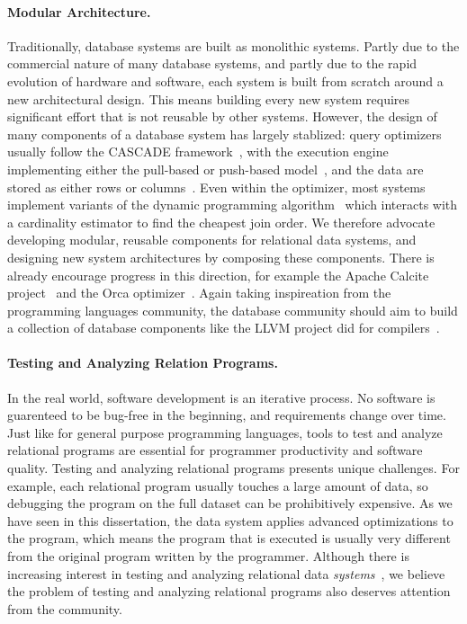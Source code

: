 \paragraph*{Modular Architecture.}
Traditionally, database systems are built as monolithic systems.
Partly due to the commercial nature of many database systems, 
 and partly due to the rapid evolution of hardware and software,
 each system is built from scratch 
 around a new architectural design.
This means building every new system requires significant effort
 that is not reusable by other systems.
However, the design of many components of a database system 
 has largely stablized:
 query optimizers usually follow the \textsf{CASCADE} framework~\cite{Graefe95a},
 with the execution engine implementing either the pull-based or push-based model~\cite{DBLP:journals/pvldb/KerstenLKNPB18},
 and the data are stored as either rows or columns~\cite{DBLP:journals/ftdb/AbadiBHIM13}.
Even within the optimizer, most systems implement variants of the dynamic programming algorithm~\cite{DBLP:conf/vldb/MoerkotteN06}
 which interacts with a cardinality estimator to find the cheapest join order.
We therefore advocate developing modular, reusable components 
 for relational data systems, 
 and designing new system architectures by composing these components.
There is already encourage progress in this direction, 
 for example the Apache Calcite project~\cite{begoli2018apache} and 
 the Orca optimizer~\cite{DBLP:conf/sigmod/SolimanAREGSCGRPWNKB14}.
Again taking inspireation from the programming languages community, 
 the database community should aim to build a collection of 
 database components like the LLVM project did for compilers~\cite{DBLP:conf/cgo/LattnerA04}.

\paragraph*{Testing and Analyzing Relation Programs.}
In the real world, software development is an iterative process.
No software is guarenteed to be bug-free in the beginning, 
 and requirements change over time.
Just like for general purpose programming languages,
 tools to test and analyze relational programs are essential
 for programmer productivity and software quality.
Testing and analyzing relational programs presents unique challenges.
For example, each relational program usually touches a large amount of data, 
 so debugging the program on the full dataset can be prohibitively expensive.
As we have seen in this dissertation, 
 the data system applies advanced optimizations to the program,
 which means the program that is executed is usually very different
 from the original program written by the programmer.
Although there is increasing interest 
 in testing and analyzing relational data {\em systems}~\cite{DBLP:journals/pacmpl/RiggerS20,DBLP:conf/osdi/RiggerS20,DBLP:conf/sigsoft/RiggerS20},
 we believe the problem of testing and analyzing relational programs
 also deserves attention from the community.